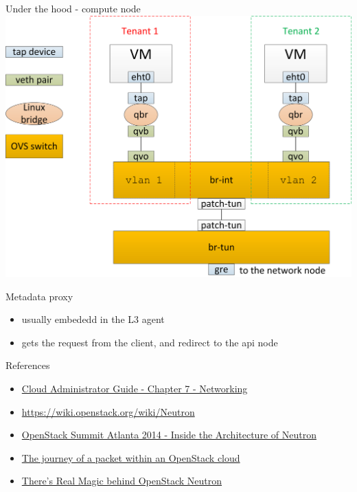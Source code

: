\documentclass[english,serif,mathserif,xcolor=pdftex,dvipsnames,table]{beamer}
\begin{document}
\begin{frame}
  {Under the hood - compute node}
  \includegraphics[width=\linewidth]{under-the-hood-compute}
\end{frame}


\begin{frame}
  {Metadata proxy}

  \begin{itemize}
  \item usually embededd in the L3 agent

  \item gets the request from the client, and redirect to the api node
  \end{itemize}
\end{frame}

\begin{frame}
  {References}
  \begin{itemize}
  \item \href{http://docs.openstack.org/admin-guide-cloud/content/ch_networking.html}{Cloud
      Administrator Guide - Chapter 7 - Networking}
  \item \url{https://wiki.openstack.org/wiki/Neutron}
  \item \href{http://www.confreaks.com/videos/3533-openstacksummitatl2014-inside-the-architecture-of-neutron}{OpenStack
      Summit Atlanta 2014 - Inside the Architecture of Neutron}
  \item
    \href{http://masimum.inf.um.es/fjrm/2013/12/26/the-journey-of-a-packet-within-an-openstack-cloud/}
    {The journey of a packet within an OpenStack cloud}
  \item
    \href{http://pinrojas.com/2014/07/29/theres-real-magic-behind-openstack-neutron/}
    {There's Real Magic behind OpenStack Neutron}
  \end{itemize}
\end{frame}
\end{document}

